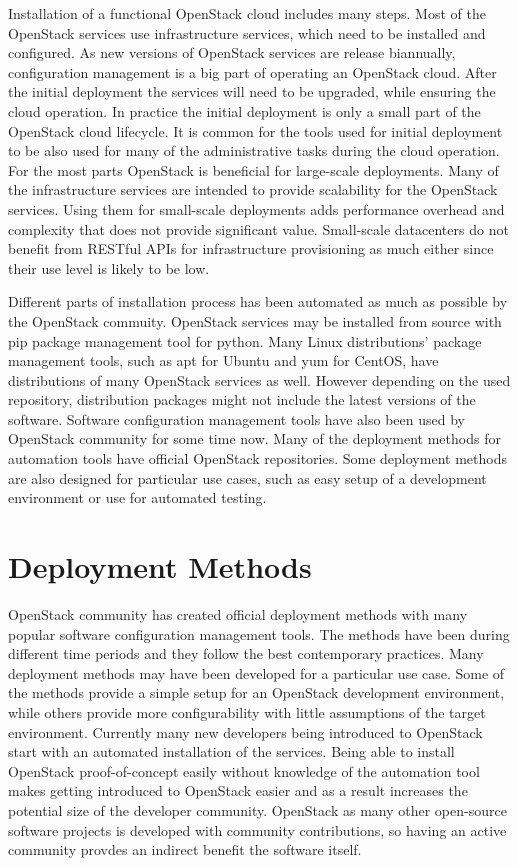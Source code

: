 Installation of a functional OpenStack cloud includes many steps. Most of the
OpenStack services use infrastructure services, which need to be installed and
configured. As new versions of OpenStack services are release biannually,
configuration management is a big part of operating an OpenStack cloud. After
the initial deployment the services will need to be upgraded, while ensuring
the cloud operation. In practice the initial deployment is only a small part of
the OpenStack cloud lifecycle. It is common for the tools used for initial
deployment to be also used for many of the administrative tasks during the
cloud operation. For the most parts OpenStack is beneficial for large-scale
deployments. Many of the infrastructure services are intended to provide
scalability for the OpenStack services. Using them for small-scale deployments
adds performance overhead and complexity that does not provide significant
value. Small-scale datacenters do not benefit from RESTful APIs for
infrastructure provisioning as much either since their use level is likely to
be low.

Different parts of installation process has been automated as much as possible
by the OpenStack commuity. OpenStack services may be installed from source with
pip package management tool for python. Many Linux distributions' package
management tools, such as apt for Ubuntu and yum for CentOS, have distributions
of many OpenStack services as well. However depending on the used repository,
distribution packages might not include the latest versions of the software.
Software configuration management tools have also been used by OpenStack
community for some time now. Many of the deployment methods for automation
tools have official OpenStack repositories. Some deployment methods are also
designed for particular use cases, such as easy setup of a development
environment or use for automated testing.

\section{Deployment Methods}

OpenStack community has created  official deployment methods with many popular
software configuration management tools. The methods have been during different
time periods and they follow the best contemporary practices. Many deployment
methods may have been developed for a particular use case. Some of the methods
provide a simple setup for an OpenStack development environment, while others
provide more configurability with little assumptions of the target environment.
Currently many new developers being introduced to OpenStack start with an
automated installation of the services. Being able to install OpenStack
proof-of-concept easily without knowledge of the automation tool makes getting
introduced to OpenStack easier and as a result increases the potential size of
the developer community. OpenStack as many other open-source software projects
is developed with community contributions, so having an active community
provdes an indirect benefit the software itself.


